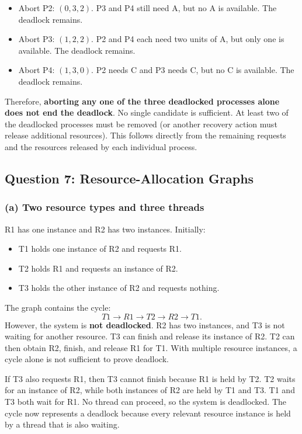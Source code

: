 \documentclass[conference]{IEEEtran}
\begin{document}
\begin{itemize}
    \item Abort P2: \((0,3,2)\). P3 and P4 still need A, but no A is available. The deadlock remains.
    \item Abort P3: \((1,2,2)\). P2 and P4 each need two units of A, but only one is available. The deadlock remains.
    \item Abort P4: \((1,3,0)\). P2 needs C and P3 needs C, but no C is available. The deadlock remains.
\end{itemize}

Therefore, \textbf{aborting any one of the three deadlocked processes alone does not end the deadlock}. No single candidate is sufficient. At least two of the deadlocked processes must be removed (or another recovery action must release additional resources). This follows directly from the remaining requests and the resources released by each individual process.

\subsection{Question 7: Resource-Allocation Graphs}

\subsubsection{(a) Two resource types and three threads}
R1 has one instance and R2 has two instances. Initially:
\begin{itemize}
    \item T1 holds one instance of R2 and requests R1.
    \item T2 holds R1 and requests an instance of R2.
    \item T3 holds the other instance of R2 and requests nothing.
\end{itemize}

The graph contains the cycle:
\[
T1 \rightarrow R1 \rightarrow T2 \rightarrow R2 \rightarrow T1.
\]
However, the system is \textbf{not deadlocked}. R2 has two instances, and T3 is not waiting for another resource. T3 can finish and release its instance of R2. T2 can then obtain R2, finish, and release R1 for T1. With multiple resource instances, a cycle alone is not sufficient to prove deadlock.

If T3 also requests R1, then T3 cannot finish because R1 is held by T2. T2 waits for an instance of R2, while both instances of R2 are held by T1 and T3. T1 and T3 both wait for R1. No thread can proceed, so the system is deadlocked. The cycle now represents a deadlock because every relevant resource instance is held by a thread that is also waiting.
\end{document}
